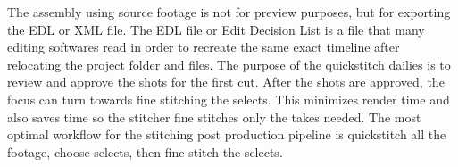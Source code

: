 \begin{fullwidth}

The assembly using source footage is not for preview purposes, but for exporting the EDL or XML file. The EDL file or Edit Decision List is a file that many editing softwares read in order to recreate the same exact timeline after relocating the project folder and files. The purpose of the quickstitch dailies is to review and approve the shots for the first cut. After the shots are approved, the focus can turn towards fine stitching the selects. This minimizes render time and also saves time so the stitcher fine stitches only the takes needed. The most optimal workflow for the stitching post production pipeline is quickstitch all the footage, choose selects, then fine stitch the selects.


\clearpage
\end{fullwidth}